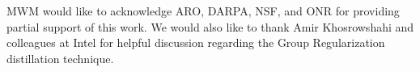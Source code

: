 \documentclass[sigconf]{acmart}
\begin{document}



\maketitle









\begin{acks}
MWM would like to acknowledge ARO, DARPA, NSF, and ONR for providing partial support of this work.
We would also like to thank Amir Khosrowshahi and colleagues at Intel for helpful discussion regarding the Group Regularization distillation technique.
\end{acks}


%
%


\newpage
\appendix

\end{document}
